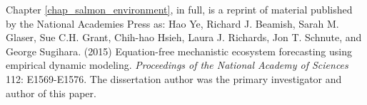 Chapter \ref{chap_salmon_environment}, in full, is a reprint of material published by the National Academies Press as: Hao Ye, Richard J. Beamish, Sarah M. Glaser, Sue C.H. Grant, Chih-hao Hsieh, Laura J. Richards, Jon T. Schnute, and George Sugihara. (2015) Equation-free mechanistic ecosystem forecasting using empirical dynamic modeling. \emph{Proceedings of the National Academy of Sciences} 112: E1569-E1576. The dissertation author was the primary investigator and author of this paper.